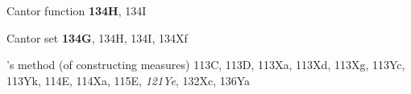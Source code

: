 \indexmedskip















Cantor function {\bf 134H}, 134I



Cantor set {\bf 134G}, 134H, 134I, 134Xf








\indexheader{\Caratheodory}


\Caratheodory's method (of constructing measures) 113C, 113D, 113Xa, 113Xd,
113Xg, 113Yc, 113Yk, 114E, 114Xa, 115E, {\it 121Ye},
132Xc, 136Ya












































































